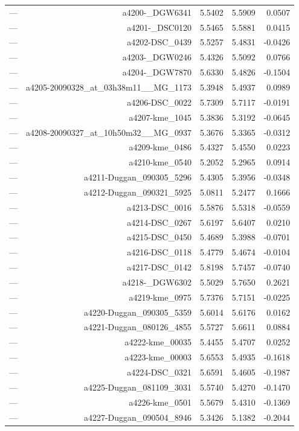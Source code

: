 \begin{table}[htbp]
\begin{tabular}{lrrrr}
— & a4200-_DGW6341 & 5.5402 & 5.5909 & 0.0507 \\
— & a4201-_DSC0120 & 5.5465 & 5.5881 & 0.0415 \\
— & a4202-DSC_0439 & 5.5257 & 5.4831 & -0.0426 \\
— & a4203-_DGW0246 & 5.4326 & 5.5092 & 0.0766 \\
— & a4204-_DGW7870 & 5.6330 & 5.4826 & -0.1504 \\
— & a4205-20090328_at_03h38m11__MG_1173 & 5.3948 & 5.4937 & 0.0989 \\
— & a4206-DSC_0022 & 5.7309 & 5.7117 & -0.0191 \\
— & a4207-kme_1045 & 5.3836 & 5.3192 & -0.0645 \\
— & a4208-20090327_at_10h50m32__MG_0937 & 5.3676 & 5.3365 & -0.0312 \\
— & a4209-kme_0486 & 5.4327 & 5.4550 & 0.0223 \\
— & a4210-kme_0540 & 5.2052 & 5.2965 & 0.0914 \\
— & a4211-Duggan_090305_5296 & 5.4305 & 5.3956 & -0.0348 \\
— & a4212-Duggan_090321_5925 & 5.0811 & 5.2477 & 0.1666 \\
— & a4213-DSC_0016 & 5.5876 & 5.5318 & -0.0559 \\
— & a4214-DSC_0267 & 5.6197 & 5.6407 & 0.0210 \\
— & a4215-DSC_0450 & 5.4689 & 5.3988 & -0.0701 \\
— & a4216-DSC_0118 & 5.4779 & 5.4674 & -0.0104 \\
— & a4217-DSC_0142 & 5.8198 & 5.7457 & -0.0740 \\
— & a4218-_DGW6302 & 5.5029 & 5.7650 & 0.2621 \\
— & a4219-kme_0975 & 5.7376 & 5.7151 & -0.0225 \\
— & a4220-Duggan_090305_5359 & 5.6014 & 5.6176 & 0.0162 \\
— & a4221-Duggan_080126_4855 & 5.5727 & 5.6611 & 0.0884 \\
— & a4222-kme_00035 & 5.4455 & 5.4707 & 0.0252 \\
— & a4223-kme_00003 & 5.6553 & 5.4935 & -0.1618 \\
— & a4224-DSC_0321 & 5.6591 & 5.4605 & -0.1987 \\
— & a4225-Duggan_081109_3031 & 5.5740 & 5.4270 & -0.1470 \\
— & a4226-kme_0501 & 5.5679 & 5.4310 & -0.1369 \\
— & a4227-Duggan_090504_8946 & 5.3426 & 5.1382 & -0.2044 \\

\end{tabular}
\end{table}
